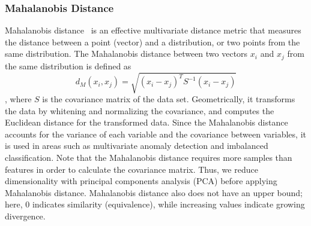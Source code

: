 \subsubsection{Mahalanobis Distance}
Mahalanobis distance~\cite{Mah} is an effective multivariate distance metric that measures the distance between a point (vector) and a distribution, or two points from the same distribution. 
The Mahalanobis distance between two vectors $x_i$ and $x_j$ from the same distribution is defined as
\begin{equation}d_{M}(x_i, x_j)=\sqrt{(x_i-x_j)^{T} S^{-1}(x_i-x_j)}
\end{equation}, where $S$ is the covariance matrix of the data set. Geometrically, it transforms the data by whitening and normalizing the covariance, and computes the Euclidean distance for the transformed data. Since the Mahalanobis distance accounts for the variance of each variable and the covariance between variables, it is used in areas such as multivariate anomaly detection and imbalanced classification. Note that the Mahalanobis distance requires more samples than features in order to calculate the covariance matrix. Thus, we reduce dimensionality with principal components analysis (PCA) before applying Mahalanobis distance. Mahalanobis distance also does not have an upper bound; here, 0 indicates similarity (equivalence), while increasing values indicate growing divergence. 

